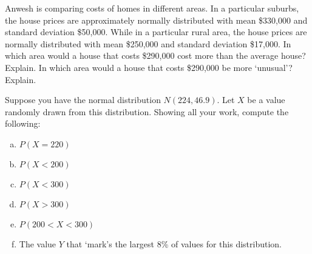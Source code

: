 \documentclass[11pt,letterpaper]{article}
\begin{document}

 Anwesh is comparing costs of homes in different areas. In a particular suburbs, the house prices are approximately normally distributed with mean \$330,000 and standard deviation \$50,000. While in a particular rural area, the house prices are normally distributed with mean \$250,000 and standard deviation \$17,000. In which area would a house that costs \$290,000 cost more than the average house? Explain. In which area would a house that costs \$290,000 be more `unusual'? Explain. 



\newpage



 Suppose you have the normal distribution $N(224, 46.9)$. Let $X$ be a value randomly drawn from this distribution. Showing all your work, compute the following:
	\begin{enumerate}[(a)]
	\item $P(X= 220)$
	\item $P(X < 200)$
	\item $P(X < 300)$
	\item $P(X > 300)$
	\item $P(200 < X < 300)$
	\item The value $Y$ that `mark's the largest 8\% of values for this distribution. 
	\end{enumerate}
\end{document}
